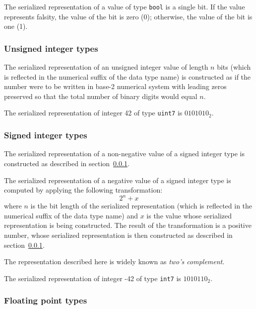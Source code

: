 The serialized representation of a value of type \verb|bool| is a single bit.
If the value represents falsity, the value of the bit is zero (0); otherwise, the value of the bit is one (1).

\subsubsection{Unsigned integer types}\label{sec:dsdl_serialized_unsigned_integer}

The serialized representation of an unsigned integer value of length $n$ bits
(which is reflected in the numerical suffix of the data type name)
is constructed as if the number were to be written in base-2 numerical system
with leading zeros preserved so that the total number of binary digits would equal $n$.

\begin{remark}
    The serialized representation of integer 42 of type \verb|uint7| is $0101010_2$.
\end{remark}

\subsubsection{Signed integer types}

The serialized representation of a non-negative value of a signed integer type is constructed as described
in section~\ref{sec:dsdl_serialized_unsigned_integer}.

The serialized representation of a negative value of a signed integer type is computed by
applying the following transformation:
$$2^n + x$$
where $n$ is the bit length of the serialized representation
(which is reflected in the numerical suffix of the data type name)
and $x$ is the value whose serialized representation is being constructed.
The result of the transformation is a positive number,
whose serialized representation is then constructed as described in section~\ref{sec:dsdl_serialized_unsigned_integer}.

The representation described here is widely known as \emph{two's complement}.

\begin{remark}
    The serialized representation of integer -42 of type \verb|int7| is $1010110_2$.
\end{remark}

\subsubsection{Floating point types}

